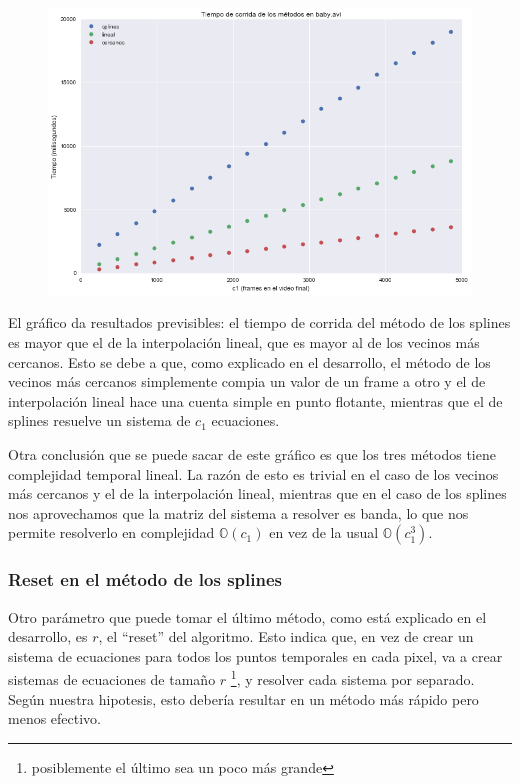 \begin{figure}[H]
\centering
\includegraphics[width=.95\textwidth]{graficos/tiempo_baby.png}
\end{figure}

El gr\'afico da resultados previsibles: el tiempo de corrida del m\'etodo de los
splines es mayor que el de la interpolaci\'on lineal, que es mayor al de los
vecinos m\'as cercanos. Esto se debe a que, como explicado en el desarrollo,
el m\'etodo de los vecinos m\'as cercanos simplemente compia un valor de un
frame a otro y el de interpolaci\'on lineal hace una cuenta simple en punto
flotante, mientras que el de splines resuelve un sistema de $c_1$ ecuaciones.

Otra conclusi\'on que se puede sacar de este gr\'afico es que los tres m\'etodos
tiene complejidad temporal lineal. La raz\'on de esto es trivial en el caso de los
vecinos m\'as cercanos y el de la interpolaci\'on lineal, mientras que en el
caso de los splines nos aprovechamos que la matriz del sistema a resolver es
banda, lo que nos permite resolverlo en complejidad $\mathbb{O}(c_1)$ en vez de
la usual $\mathbb{O}(c_1^3)$.

\subsubsection{Reset en el m\'etodo de los splines}

Otro par\'ametro que puede tomar el \'ultimo m\'etodo, como est\'a explicado en
el desarrollo, es $r$, el ``reset'' del algoritmo. Esto indica que, en vez de
crear un sistema de ecuaciones para todos los puntos temporales en cada pixel,
va a crear sistemas de ecuaciones de tama\~no $r$ \footnote{posiblemente el
\'ultimo sea un poco m\'as grande}, y resolver cada sistema por separado.
Seg\'un nuestra hipotesis, esto deber\'ia resultar en un m\'etodo m\'as r\'apido
pero menos efectivo.

